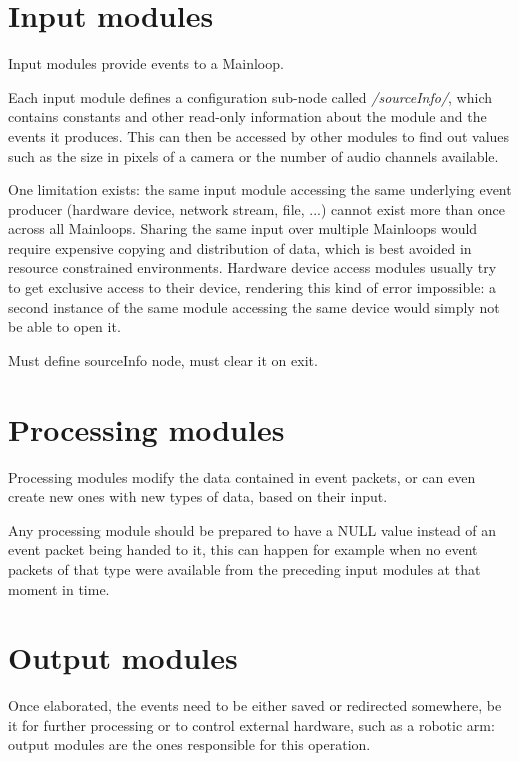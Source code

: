 \documentclass[a4paper,12pt]{report}
\begin{document}
\section{Input modules} \label{sec:input_modules}

Input modules provide events to a Mainloop.

Each input module defines a configuration sub-node called \emph{/sourceInfo/}, which contains constants and other read-only information about the module and the events it produces. This can then be accessed by other modules to find out values such as the size in pixels of a camera or the number of audio channels available.

One limitation exists: the same input module accessing the same underlying event producer (hardware device, network stream, file, ...) cannot exist more than once across all Mainloops. Sharing the same input over multiple Mainloops would require expensive copying and distribution of data, which is best avoided in resource constrained environments.
Hardware device access modules usually try to get exclusive access to their device, rendering this kind of error impossible: a second instance of the same module accessing the same device would simply not be able to open it.

Must define sourceInfo node, must clear it on exit.


\section{Processing modules} \label{sec:processing_modules}

Processing modules modify the data contained in event packets, or can even create new ones with new types of data, based on their input.

Any processing module should be prepared to have a NULL value instead of an event packet being handed to it, this can happen for example when no event packets of that type were available from the preceding input modules at that moment in time.

\section{Output modules} \label{sec:output_modules}

Once elaborated, the events need to be either saved or redirected somewhere, be it for further processing or to control external hardware, such as a robotic arm: output modules are the ones responsible for this operation.
\end{document}
